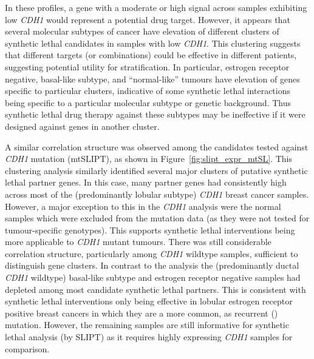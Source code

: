 In these  profiles, a gene with a moderate or high signal across samples exhibiting low \textit{CDH1}  would represent a potential drug target. However, it appears that several molecular subtypes of cancer have elevation of different clusters of \gls{synthetic lethal} candidates in samples with low \textit{CDH1}. This clustering suggests that different targets (or combinations) could be effective in different patients, suggesting potential utility for stratification.  In particular, estrogen receptor negative, basal-like subtype, and ``normal-like'' tumours \citep{Eroles2012, Parker2009, Dai2015} have elevation of genes specific to particular clusters, indicative of some \gls{synthetic lethal} interactions being specific to a particular molecular subtype or genetic background. Thus \gls{synthetic lethal} drug therapy against these subtypes may be ineffective if it were designed against genes in another cluster.
 
A similar correlation structure was observed among the candidates tested against \textit{CDH1} \gls{mutation} (\acrshort{mtSLIPT}), as shown in Figure~\ref{fig:slipt_expr_mtSL}. This clustering analysis similarly identified several major clusters of putative \gls{synthetic lethal} partner genes. In this case, many partner genes had consistently high  across most of the (predominantly lobular subtype) \textit{CDH1} breast cancer samples. However, a major exception to this in the \textit{CDH1}  analysis were the normal samples which were excluded from the \gls{mutation} data (as they were not tested for tumour-specific genotypes). This supports \gls{synthetic lethal} interventions being more applicable to \textit{CDH1} \gls{mutant} tumours. There was still considerable correlation structure, particularly among \textit{CDH1} wildtype samples, sufficient to distinguish gene clusters. In contrast to the  analysis the (predominantly ductal \textit{CDH1} wildtype) basal-like subtype and estrogen receptor negative samples had depleted  among most candidate \gls{synthetic lethal} partners. This is consistent with \gls{synthetic lethal} interventions only being effective in lobular estrogen receptor positive breast cancers in which they are a more common, as recurrent () \gls{mutation}. However, the remaining samples are still informative for \gls{synthetic lethal} analysis (by \gls{SLIPT}) as it requires highly expressing \textit{CDH1} samples for comparison.


